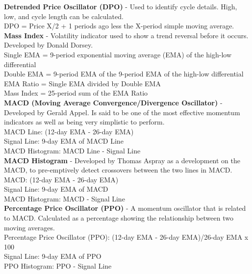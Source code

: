 \documentclass[12pt,a4paper]{article}
\begin{document}
\textbf{Detrended Price Oscillator (DPO)} - Used to identify cycle details. High, low, and cycle length can be calculated.\\

DPO = Price {X/2 + 1} periods ago less the X-period simple moving average.\\

\iffalse
[]
\fi

\textbf{Mass Index} - Volatility indicator used to show a trend reversal before it occurs. Developed by Donald Dorsey. \\

Single EMA = 9-period exponential moving average (EMA) of the high-low differential \\
Double EMA = 9-period EMA of the 9-period EMA of the high-low differential \\
EMA Ratio = Single EMA divided by Double EMA \\
Mass Index = 25-period sum of the EMA Ratio \\

\iffalse
[]
\fi

\textbf{MACD (Moving Average Convergence/Divergence Oscillator)} - Developed by Gerald Appel. Is said to be one of the most effective momentum indicators as well as being very simplistic to perform. \\

MACD Line: (12-day EMA - 26-day EMA)\\
Signal Line: 9-day EMA of MACD Line\\
MACD Histogram: MACD Line - Signal Line\\

\iffalse
[]
\fi

\textbf{MACD Histogram} - Developed by Thomas Aspray as a development on the MACD, to pre-emptively detect crossovers between the two lines in MACD.\\

MACD: (12-day EMA - 26-day EMA) \\
Signal Line: 9-day EMA of MACD \\
MACD Histogram: MACD - Signal Line \\

\iffalse
[]
\fi

\textbf{Percentage Price Oscillator (PPO)} - A momentum oscillator that is related to MACD. Calculated as a percentage showing the relationship between two moving averages. \\

Percentage Price Oscillator (PPO): {(12-day EMA - 26-day EMA)/26-day EMA} x 100 \\
Signal Line: 9-day EMA of PPO \\
PPO Histogram: PPO - Signal Line \\
\end{document}
